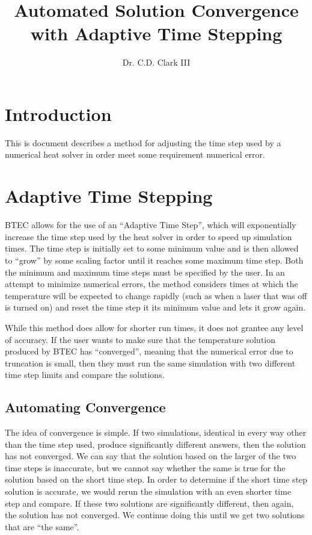 \documentclass[letterpaper]{report}
\title{Automated Solution Convergence with Adaptive Time Stepping}
\author{Dr. C.D. Clark III}
\begin{document}
\maketitle

\section{Introduction}
This is document describes a method for adjusting the time step used by a numerical heat solver in order meet some requirement numerical error.

\section{Adaptive Time Stepping}
BTEC allows for the use of an ``Adaptive Time Step'', which will exponentially increase the time step used by the heat solver in order to speed up
simulation times. The time step is initially set to some minimum value and is then allowed to ``grow'' by some scaling factor until it reaches some
maximum time step. Both the minimum and maximum time steps must be specified by the user. In an attempt to minimize numerical errors, the
method considers times at which the temperature will be expected to change rapidly (such as when a laser that was off is turned on) and reset the time
step it its minimum value and lets it grow again. 

While this method does allow for shorter run times, it does not grantee any level of accuracy. If the user wants to make sure that the temperature
solution produced by BTEC has ``converged'', meaning that the numerical error due to truncation is small, then they must run the same simulation with
two different time step limits and compare the solutions.

\subsection{Automating Convergence}
The idea of convergence is simple. If two simulations, identical in every way other than the time step used, produce significantly
different answers, then the solution has not converged. We can say that the solution based on the larger of the two time steps is inaccurate, but we
cannot say whether the same is true for the solution based on the short time step. In order to determine if the short time step solution is accurate,
we would rerun the simulation with an even shorter time step and compare. If these two solutions are significantly different, then again, the solution
has not converged. We continue doing this until we get two solutions that are ``the same''.
\end{document}
